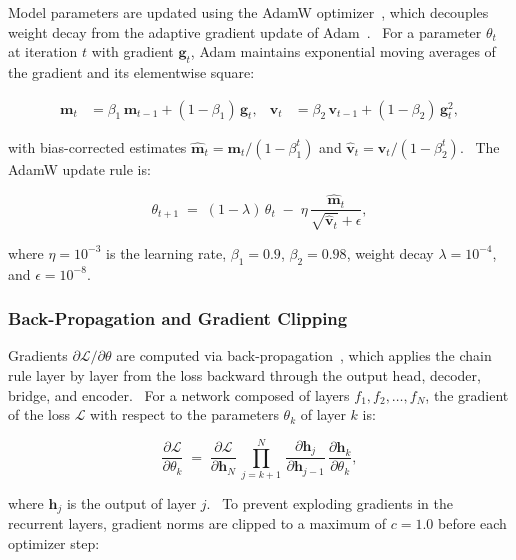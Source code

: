 \documentclass[12pt,a4paper]{report}
\begin{document}
Model parameters are updated using the AdamW optimizer~\cite{loshchilov2019}, which decouples weight decay from the adaptive gradient update of Adam~\cite{kingma2015}.  For a parameter $\theta_t$ at iteration $t$ with gradient $\mathbf{g}_t$, Adam maintains exponential moving averages of the gradient and its elementwise square:

\begin{align}
\mathbf{m}_t &= \beta_1\,\mathbf{m}_{t-1} + (1-\beta_1)\,\mathbf{g}_t, &
\mathbf{v}_t &= \beta_2\,\mathbf{v}_{t-1} + (1-\beta_2)\,\mathbf{g}_t^2,
\label{eq:adam_moments}
\end{align}

with bias-corrected estimates $\hat{\mathbf{m}}_t = \mathbf{m}_t / (1-\beta_1^t)$ and $\hat{\mathbf{v}}_t = \mathbf{v}_t / (1-\beta_2^t)$.  The AdamW update rule is:

\begin{equation}
\theta_{t+1} \;=\; (1 - \lambda)\,\theta_t \;-\; \eta\,
\frac{\hat{\mathbf{m}}_t}{\sqrt{\hat{\mathbf{v}}_t} + \epsilon},
\label{eq:adamw_update}
\end{equation}

where $\eta = 10^{-3}$ is the learning rate, $\beta_1 = 0.9$, $\beta_2 = 0.98$, weight decay $\lambda = 10^{-4}$, and $\epsilon = 10^{-8}$.

\subsubsection{Back-Propagation and Gradient Clipping}

Gradients $\partial\mathcal{L}/\partial\theta$ are computed via back-propagation~\cite{rumelhart1986}, which applies the chain rule layer by layer from the loss backward through the output head, decoder, bridge, and encoder.  For a network composed of layers $f_1, f_2, \ldots, f_N$, the gradient of the loss $\mathcal{L}$ with respect to the parameters $\theta_k$ of layer $k$ is:

\begin{equation}
\frac{\partial \mathcal{L}}{\partial \theta_k}
\;=\; \frac{\partial \mathcal{L}}{\partial \mathbf{h}_N}
\,\prod_{j=k+1}^{N}\,
\frac{\partial \mathbf{h}_j}{\partial \mathbf{h}_{j-1}}
\,\frac{\partial \mathbf{h}_k}{\partial \theta_k},
\label{eq:backprop}
\end{equation}

\noindent where $\mathbf{h}_j$ is the output of layer $j$.  To prevent exploding gradients in the recurrent layers, gradient norms are clipped to a maximum of $c = 1.0$ before each optimizer step:
\end{document}
